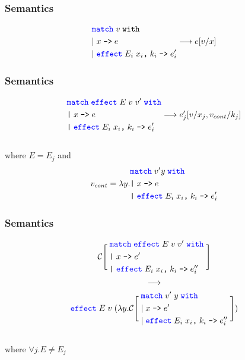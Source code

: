 \documentclass{beamer}
\newcommand{\Text}[1]{\texttt{#1}}
\newcommand{\Keyword}[1]{{\color{blue}{\Text{#1}}}}
\begin{document}
\begin{frame}[fragile]
\frametitle{Semantics}
\begin{equation*}
\begin{aligned}
 & \Keyword{match} \; v \; \mathtt{with} \\
 & | \; x \; \Text{->} \; e \\
 & | \; \Keyword{effect} \; E_i \; x_i\Text{,} \; k_i \;
     \Text{->} \; e^\prime_i
\end{aligned}
\longrightarrow
e[v/x]
\end{equation*}
\end{frame}


\begin{frame}[fragile]
\frametitle{Semantics}
\begin{equation*}
\begin{aligned}
 & \Keyword{match} \; \Keyword{effect}\;E\;v\;v^\prime \; \Keyword{with} \\
 & \Text{|} \; x \; \Text{->} \; e \\
 & \Text{|} \; \Keyword{effect} \; E_i \; x_i \Text{,} \; k_i \;
     \Text{->} \; e^\prime_i
\end{aligned}
\longrightarrow
e^\prime_j[v/x_j, v_{cont}/k_j]
\end{equation*}
\\[2em]
where $E = E_j$ and
\begin{equation*}
v_{cont} = \lambda y.
\begin{aligned}
 & \Keyword{match} \; v^\prime y \; \Keyword{with} \\
 & \Text{|} \; x \; \Text{->} \; e \\
 & \Text{|} \; \Keyword{effect} \; E_i \; x_i \Text{,} \; k_i \;
     \Text{->} \; e^\prime_i
\end{aligned}
\end{equation*}
\end{frame}

\begin{frame}[fragile]
\frametitle{Semantics}
\begin{multline*}
\mathcal{C} \Bigg[ \;
\begin{aligned}
 & \Keyword{match} \; \Keyword{effect}\;E\;v\;v^\prime \; \Keyword{with} \\
 & \Text{|} \; x \; \Text{->} \; e^\prime \\
 & \Text{|} \; \Keyword{effect} \; E_i \; x_i\Text{,} \; k_i \;
     \Text{->} \; e^{\prime\prime}_i
\end{aligned}
\; \Bigg] \\
\longrightarrow \\
\Keyword{effect} \; E \; v \;
(\lambda y.
\mathcal{C} \Bigg[ \;
\begin{aligned}
 & \Keyword{match} \; v^\prime \; y \; \Keyword{with} \\
 & | \; x \; \Text{->} \; e^\prime \\
 & | \; \Keyword{effect} \; E_i \; x_i\Text{,} \; k_i \;
     \Text{->} \; e^{\prime\prime}_i
\end{aligned}
\; \Bigg] )
\end{multline*}
\\[2em]
where $\forall j. E \neq E_j$
\end{frame}
\end{document}
